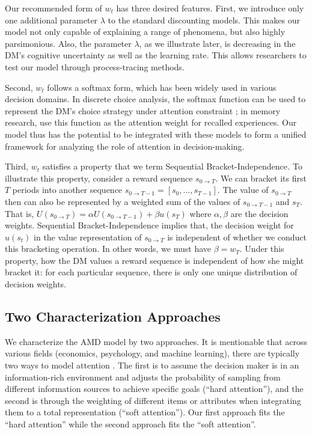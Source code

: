 \documentclass[
  12pt,
]{article}
\begin{document}
Our recommended form of \(w_t\) has three desired features. First, we
introduce only one additional parameter \(\lambda\) to the standard
discounting models. This makes our model not only capable of explaining
a range of phenomena, but also highly parsimonious. Also, the parameter
\(\lambda\), as we illustrate later, is decreasing in the DM's cognitive
uncertainty as well as the learning rate. This allows researchers to
test our model through process-tracing methods.

Second, \(w_t\) follows a softmax form, which has been widely used in
various decision domains. In discrete choice analysis, the softmax
function can be used to represent the DM's choice strategy under
attention constraint \citep{matvejka2015rational}; in memory research,
\citet{bordalo2020memory} use this function as the attention weight for
recalled experiences. Our model thus has the potential to be integrated
with these models to form a unified framework for analyzing the role of
attention in decision-making.

Third, \(w_t\) satisfies a property that we term Sequential
Bracket-Independence\emph{.} To illustrate this property, consider a
reward sequence \(s_{0\rightarrow T}\). We can bracket its first \(T\)
periods into another sequence
\(s_{0\rightarrow T-1}=[s_0,...,s_{T-1}]\). The value of
\(s_{0\rightarrow T}\) then can also be represented by a weighted sum of
the values of \(s_{0\rightarrow T-1}\) and \(s_T\). That is,
\(U(s_{0\rightarrow T})=\alpha U(s_{0\rightarrow T-1})+\beta u(s_T)\)
where \(\alpha,\beta\) are the decision weights. Sequential
Bracket-Independence implies that, the decision weight for \(u(s_t)\) in
the value representation of \(s_{0\rightarrow T}\) is independent of
whether we conduct this bracketing operation. In other words, we must
have \(\beta = w_T\). Under this property, how the DM values a reward
sequence is independent of how she might bracket it: for each particular
sequence, there is only one unique distribution of decision weights.

\hypertarget{two-characterization-approaches}{%
\subsection{Two Characterization
Approaches}\label{two-characterization-approaches}}

We characterize the AMD model by two approaches. It is mentionable that
across various fields (economics, psychology, and machine learning),
there are typically two ways to model attention
\citep{xu2015show, gabaix2019behavioral, lindsay2020attention}. The
first is to assume the decision maker is in an information-rich
environment and adjusts the probability of sampling from different
information sources to achieve specific goals (``hard attention''), and
the second is through the weighting of different items or attributes
when integrating them to a total representation (``soft attention'').
Our first approach fits the ``hard attention'' while the second approach
fits the ``soft attention''.
\end{document}
